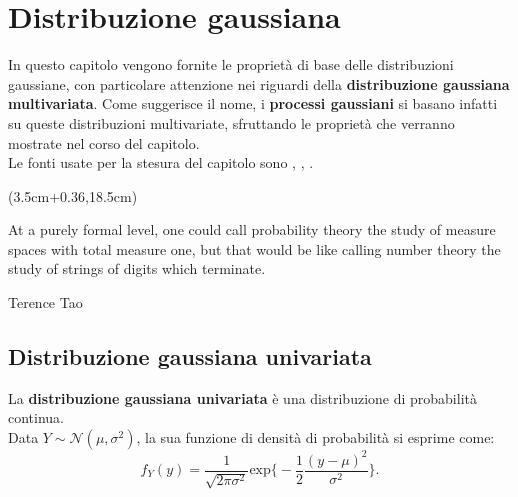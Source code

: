 \chapter{Distribuzione gaussiana}
In questo capitolo vengono fornite le proprietà di base delle distribuzioni gaussiane, con particolare attenzione nei riguardi della \textbf{distribuzione gaussiana multivariata}. Come suggerisce il nome, i \textbf{processi gaussiani} si basano infatti su queste distribuzioni multivariate, sfruttando le proprietà che verranno mostrate nel corso del capitolo.\\
Le fonti usate per la stesura del capitolo sono \cite{gut_intermediate_2009}, \cite{wilkinson_introduction_2020}, \cite{murphy_probabilistic_2022}.


\begin{textblock*}{0.64\textwidth}(3.5cm+0.36\textwidth,18.5cm)
\epigraph{At a purely formal level, one could call probability theory the study of measure spaces with total measure one, but that would be like calling number theory the study of strings of digits which terminate.}{Terence Tao}
\end{textblock*}

\newpage



\section{Distribuzione gaussiana univariata}
\begin{defi}
La \textbf{distribuzione gaussiana univariata} è una distribuzione di probabilità continua. \\
Data $Y\sim \mathcal{N}(\mu, \sigma^2)$, la sua funzione di densità di probabilità si esprime come:
\[f_Y(y) = \frac{1}{\sqrt{2\pi \sigma^2}} \text{exp}\bigg\{-\frac{1}{2}\frac{(y-\mu)^2}{\sigma^2}\bigg\}.\]
\end{defi}


